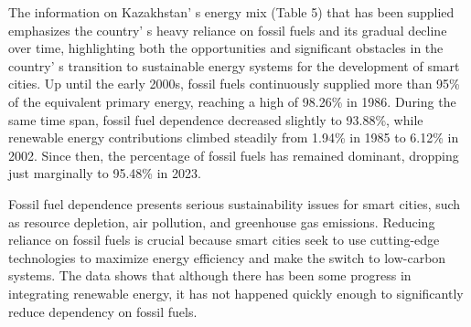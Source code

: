 
The information on Kazakhstan' s energy mix (Table 5)
that has been supplied emphasizes the country' s heavy
reliance on fossil fuels and its gradual decline over time, highlighting
both the opportunities and significant obstacles in the
country' s transition to sustainable energy systems for
the development of smart cities. Up until the early 2000s, fossil fuels
continuously supplied more than 95\% of the equivalent primary energy,
reaching a high of 98.26\% in 1986. During the same time span, fossil
fuel dependence decreased slightly to 93.88\%, while renewable energy
contributions climbed steadily from 1.94\% in 1985 to 6.12\% in 2002.
Since then, the percentage of fossil fuels has remained dominant,
dropping just marginally to 95.48\% in 2023.

Fossil fuel dependence presents serious sustainability issues for smart
cities, such as resource depletion, air pollution, and greenhouse gas
emissions. Reducing reliance on fossil fuels is crucial because smart
cities seek to use cutting-edge technologies to maximize energy
efficiency and make the switch to low-carbon systems. The data shows
that although there has been some progress in integrating renewable
energy, it has not happened quickly enough to significantly reduce
dependency on fossil fuels.

